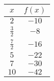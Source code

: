 \begin{tabular}{cc} \toprule
$x$           & $f(x)$ \\\midrule
$2$           & $-10$  \\[6pt]
$\frac{3}{2}$ & $-8$   \\[6pt]
$\frac{7}{2}$ & $-16$  \\[6pt]
$5$           & $-22$  \\[6pt]
$7$           & $-30$  \\[6pt]
$10$          & $-42$  \\\bottomrule
\end{tabular}
